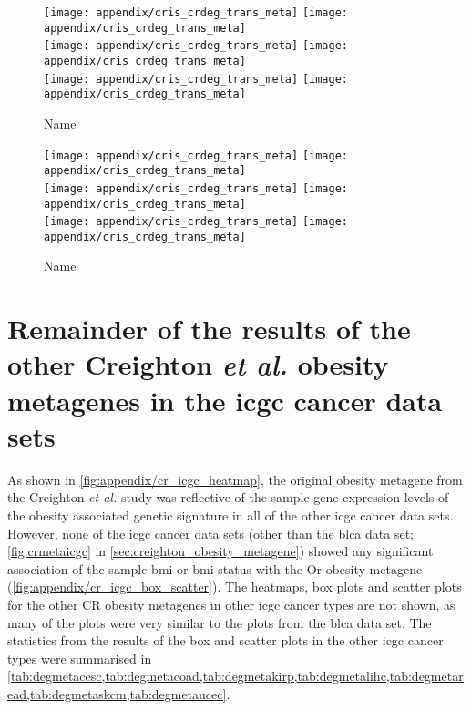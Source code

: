 \begin{appendices}
	\begin{figure}[htpb]
		\ContinuedFloat
		\captionsetup{list=off,format=cont}
		\centering
		\texttt{[image: appendix/cris\_crdeg\_trans\_meta]}
		\hfill
		\texttt{[image: appendix/cris\_crdeg\_trans\_meta]}\\
		\texttt{[image: appendix/cris\_crdeg\_trans\_meta]}
		\hfill
		\texttt{[image: appendix/cris\_crdeg\_trans\_meta]}\\
		\texttt{[image: appendix/cris\_crdeg\_trans\_meta]}
		\hfill
		\texttt{[image: appendix/cris\_crdeg\_trans\_meta]}\\
		\caption{Name}
	\end{figure}

	\begin{figure}[htpb]
		\ContinuedFloat
		\captionsetup{list=off,format=cont}
		\centering
		\texttt{[image: appendix/cris\_crdeg\_trans\_meta]}
		\hfill
		\texttt{[image: appendix/cris\_crdeg\_trans\_meta]}\\
		\texttt{[image: appendix/cris\_crdeg\_trans\_meta]}
		\hfill
		\texttt{[image: appendix/cris\_crdeg\_trans\_meta]}\\
		\texttt{[image: appendix/cris\_crdeg\_trans\_meta]}
		\hfill
		\texttt{[image: appendix/cris\_crdeg\_trans\_meta]}\\
		\caption{Name}
	\end{figure}

	\section{Remainder of the results of the other Creighton \textit{et al.} obesity metagenes in the \gls{icgc} cancer data sets}
	\label{sec:rest_of_the_cr_icgc_cancer_heatmap_results}

	As shown in \cref{fig:appendix/cr_icgc_heatmap}, the original obesity metagene from the Creighton \textit{et al.} study was reflective of the sample gene expression levels of the obesity associated genetic signature in all of the other \gls{icgc} cancer data sets.
	However, none of the \gls{icgc} cancer data sets (other than the \gls{blca} data set; \cref{fig:crmetaicgc} in \cref{sec:creighton_obesity_metagene}) showed any significant association of the sample \gls{bmi} or \gls{bmi} status with the Or obesity metagene (\cref{fig:appendix/cr_icgc_box_scatter}).
	The heatmaps, box plots and scatter plots for the other CR obesity metagenes in other \gls{icgc} cancer types are not shown, as many of the plots were very similar to the plots from the \gls{blca} data set.
	The statistics from the results of the box and scatter plots in the other \gls{icgc} cancer types were summarised in \cref{tab:degmetacesc,tab:degmetacoad,tab:degmetakirp,tab:degmetalihc,tab:degmetaread,tab:degmetaskcm,tab:degmetaucec}.


\end{appendices}
